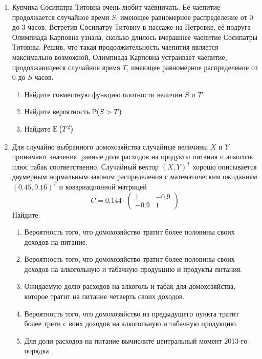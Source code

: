 \begin{enumerate}
\item Купчиха Сосипатра Титовна очень любит чаёвничать. Её чаепитие продолжается
случайное время $S$, имеющее равномерное распределение от $0$ до $3$ часов.
Встретив Сосипатру Титовну в пассаже на Петровке, её подруга Олимпиада Карповна
узнала, сколько длилось вчерашнее чаепитие Сосипатры Титовны. Решив, что такая
продолжительность чаепития является максимально возможной, Олимпиада Карповна
устраивает чаепитие, продолжающееся случайное время $T$, имеющее равномерное
распределение от $0$ до $S$ часов.
\begin{enumerate}
\item Найдите совместную функцию плотности величин $S$ и $T$
\item Найдите вероятность $\P(S>T)$
\item Найдите $\E\left(T^2\right)$
\end{enumerate}

\item Для случайно выбранного домохозяйства случайные величины $X$ и $Y$ принимают
значения, равные доле расходов на продукты питания и алкоголь плюс табак соответственно.
Случайный вектор $(X, Y)^T$  хорошо описывается двумерным нормальным законом распределения
с математическим ожиданием $(0.45, 0.16)^T$ и ковариационной матрицей
\[
C=0.144\cdot
\left(\begin{array}{cc}
1 & -0.9 \\
-0.9 & 1
\end{array}\right)
\]
Найдите:
\begin{enumerate}
\item Вероятность того, что домохозяйство тратит более половины своих доходов на питание.
\item Вероятность того, что домохозяйство тратит более половины своих доходов
на алкогольную и табачную продукцию и продукты питания.
\item Ожидаемую долю расходов на алкоголь и табак для домохозяйства, которое тратит
на питание четверть своих доходов.
\item Вероятность того, что домохозяйство из предыдущего пункта тратит более трети с
воих доходов на алкогольную и табачную продукцию.

\item Для доли расходов на питание вычислите центральный момент $2013$-го порядка.
\end{enumerate}


\end{enumerate}
